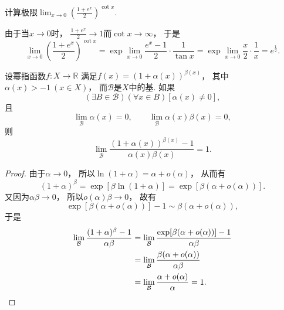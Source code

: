 \begin{example}
计算极限\(\lim_{x\to0} \left( \frac{1+e^x}2 \right)^{\cot x}\).
\begin{solution}
由于当\(x\to0\)时，
\(\frac{1+e^x}2 \to 1\)而\(\cot x \to \infty\)，
于是\[
	\lim_{x\to0} \left( \frac{1+e^x}2 \right)^{\cot x}
	= \exp\lim_{x\to0} \frac{e^x-1}2 \cdot \frac1{\tan x}
	= \exp\lim_{x\to0} \frac{x}2 \cdot \frac1x
	= e^{\frac12}.
\]
\end{solution}
\end{example}

\begin{proposition}
设幂指函数\(f\colon X\to\mathbb{R}\)
满足\(f(x) = (1+\alpha(x))^{\beta(x)}\)，
其中\(\alpha(x)>-1\ (x \in X)\)，
而\(\mathcal{B}\)是\(X\)中的基.
如果\[
	(\exists B\in\mathcal{B})
	(\forall x \in B)
	[\alpha(x)\neq0],
\]
且\[
	\lim_\mathcal{B} \alpha(x) = 0,
	\qquad
	\lim_\mathcal{B} \alpha(x) \beta(x) = 0,
\]
则\[
	\lim_\mathcal{B} \frac{(1+\alpha(x))^{\beta(x)}-1}{\alpha(x) \beta(x)} = 1.
\]
\begin{proof}
由于\(\alpha\to0\)，
所以\(\ln(1+\alpha) = \alpha + o(\alpha)\)，
从而有\[
	(1+\alpha)^{\beta}
	= \exp[\beta \ln(1+\alpha)]
	= \exp[\beta (\alpha + o(\alpha))].
\]
又因为\(\alpha \beta \to 0\)，
所以\(o(\alpha) \beta \to 0\)，
故有\[
	\exp[\beta (\alpha + o(\alpha))] - 1
	\sim \beta (\alpha + o(\alpha)),
\]
于是\begin{align*}
	\lim_\mathcal{B} \frac{(1+\alpha)^{\beta}-1}{\alpha \beta}
	&= \lim_\mathcal{B} \frac{\exp[\beta (\alpha + o(\alpha))]-1}{\alpha \beta} \\
	&= \lim_\mathcal{B} \frac{\beta (\alpha + o(\alpha))}{\alpha \beta} \\
	&= \lim_\mathcal{B} \frac{\alpha + o(\alpha)}{\alpha}
	= 1.
	\qedhere
\end{align*}
\end{proof}
\end{proposition}
